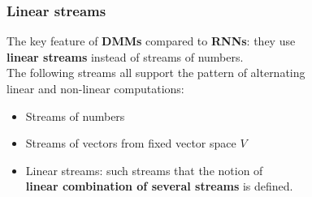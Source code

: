 \documentclass{beamer}
\newcommand{\msmagenta}[1]{{\color{mymagenta} #1}}
\begin{document}
\begin{frame}

\frametitle{\msmagenta{Linear streams}}

The key feature of {\bf DMMs} compared to {\bf RNNs}:
         they use\\ {\bf linear streams} instead of streams of numbers.\\[2ex]

The following streams all support the pattern of alternating\\ linear and non-linear computations:\\[2ex]

\begin{itemize}

\item Streams of numbers\\[2ex]

\item Streams of vectors from fixed vector space $V$\\[2ex]

\item Linear streams: such streams that the notion of\\ {\bf linear combination of several streams} is defined.\\[3ex]

\end{itemize}






\end{frame}
\end{document}
